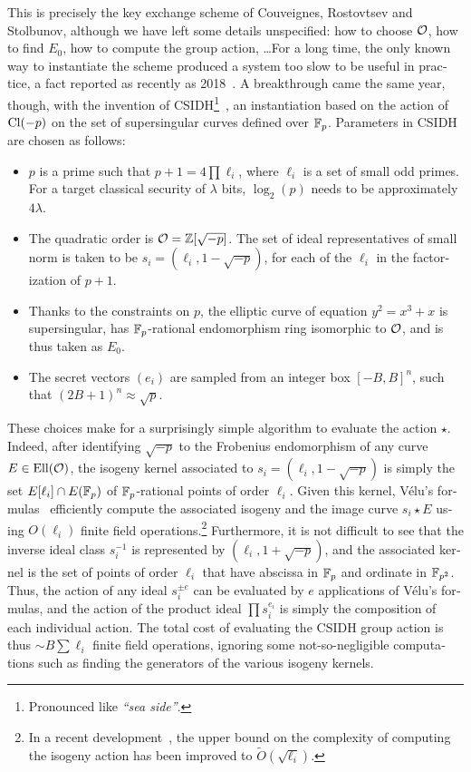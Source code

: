 \begin{otherlanguage}{english}
  This is precisely the key exchange scheme of Couveignes, Rostovtsev
  and Stolbunov, although we have left some details unspecified: how
  to choose $\mathcal{O}$, how to find $E_0$, how to compute the group action,
  \dots For a long time, the only known way to instantiate the scheme
  produced a system too slow to be useful in practice, a fact reported
  as recently as 2018~\cite{AC:DeFKieSmi18}. A breakthrough came the
  same year, though, with the invention of CSIDH\footnote{Pronounced
    like \emph{``sea side''}.}~\cite{10.1007/978-3-030-03332-3_15}, an
  instantiation based on the action of $\mathrm{Cl}(-p)$ on the set of
  supersingular curves defined over $\mathbb{F}_p$. Parameters in CSIDH are
  chosen as follows:
  \begin{itemize}
  \item $p$ is a prime such that $p+1=4\prod \ell_i$, where $\ell_i$
    is a set of small odd primes. For a target classical security of
    $\lambda$ bits, $\log_2(p)$ needs to be approximately $4\lambda$.
  \item The quadratic order is $\mathcal{O}=\mathbb{Z}[\sqrt{-p}]$.  The set of ideal
    representatives of small norm is taken to be
    $s_i=(\ell_i,1-\sqrt{-p})$, for each of the $\ell_i$ in the
    factorization of $p+1$.
  \item Thanks to the constraints on $p$, the elliptic curve of
    equation $y^2=x^3+x$ is supersingular, has $\mathbb{F}_p$-rational
    endomorphism ring isomorphic to $\mathcal{O}$, and is thus taken as
    $E_0$.
  \item The secret vectors $(e_i)$ are sampled from an integer box
    $[-B,B]^n$, such that $(2B+1)^n\approx\sqrt{p}$.
  \end{itemize}
  
  These choices make for a surprisingly simple algorithm to evaluate
  the action $\star$. Indeed, after identifying $\sqrt{-p}$ to the
  Frobenius endomorphism of any curve $E\in\mathrm{Ell}(\mathcal{O})$, the isogeny
  kernel associated to $s_i=(\ell_i,1-\sqrt{-p})$ is simply the set
  $E[\ell_i]\cap E(\mathbb{F}_p)$ of $\mathbb{F}_p$-rational points of order
  $\ell_i$. Given this kernel, Vélu's
  formulas~\cite{velu71,moody2016analogues,PQCRYPTO:Renes18}
  efficiently compute the associated isogeny and the image curve
  $s_i\star E$ using $O(\ell_i)$ finite field operations.\footnote{In
    a recent development~\cite{cryptoeprint:2020:341}, the upper bound
    on the complexity of computing the isogeny action has been
    improved to $\tilde{O}(\sqrt{\ell_i})$.}  Furthermore, it is not
  difficult to see that the inverse ideal class $s_i^{-1}$ is
  represented by $(\ell_i,1+\sqrt{-p})$, and the associated kernel is
  the set of points of order $\ell_i$ that have abscissa in $\mathbb{F}_p$ and
  ordinate in $\mathbb{F}_{p^2}$. Thus, the action of any ideal $s_i^{\pm e}$
  can be evaluated by $e$ applications of Vélu's formulas, and the
  action of the product ideal $\prod s_i^{e_i}$ is simply the
  composition of each individual action.  The total cost of evaluating
  the CSIDH group action is thus $\sim B\sum\ell_i$ finite field
  operations, ignoring some not-so-negligible computations such as
  finding the generators of the various isogeny kernels.


\end{otherlanguage}
